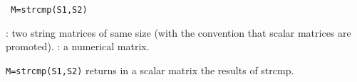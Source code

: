 
\begin{mandesc}
\end{mandesc}
\begin{calling_sequence}
\begin{verbatim}
 M=strcmp(S1,S2)  
\end{verbatim}
\end{calling_sequence}
\begin{parameters}
  \begin{varlist}
    : two string matrices of same size (with the convention that 
    scalar matrices are promoted).
    : a numerical matrix.
  \end{varlist}
\end{parameters}
\begin{mandescription}
  \verb!M=strcmp(S1,S2)! returns in a scalar matrix the results of strcmp. 
\end{mandescription}
\begin{examples}
  \begin{program}
  \end{program}
\end{examples}
\begin{manseealso}
\end{manseealso}

